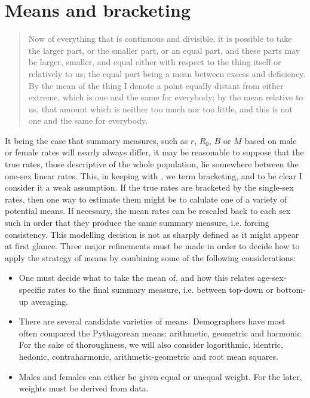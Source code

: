 \documentclass[reqno,12pt,oneside,a4paper]{report} %
\theoremstyle{plain}
\theoremstyle{definition}
\theoremstyle{remark}
\numberwithin{theorem}{chapter}     %
\begin{document}
\section{Means and bracketing}

\begin{singlespace}
\begin{quote}
Now of everything that is continuous and divisible, it is possible to take the larger part, or the smaller part, or an equal part, and these parts may be larger, smaller, and equal either with respect to the thing itself or relatively to us; the equal part being a mean between excess and deficiency. By the mean of the thing I denote a point equally distant from either extreme, which is one and the same for everybody; by the mean relative to us, that amount which is neither too much nor too little, and this is not one and the same for everybody.
\end{quote}
\end{singlespace}


It being the case that summary measures, such as $r$, $R_0$, $B$ or $M$ based on male or female rates will nearly always differ, it may be reasonable to suppose that the true rates, those descriptive of the whole population, lie somewhere between the one-sex linear rates. This, in keeping with \citet{yellin1977comparison}, we term bracketing, and to be clear I consider it a weak assumption. If the true rates are bracketed by the single-sex rates, then one way to estimate them might be to calulate one of a variety of potential means. If necessary, the mean rates can be rescaled back to each sex such in order that they produce the same summary measure, i.e. forcing consistency. This modelling decision is not as sharply defined as it might appear at first glance. Three major refinements must be made in order to decide how to apply the strategy of means by combining some of the following considerations:

\begin{itemize}
\item One must decide what to take the mean of, and how this relates age-sex-specific rates to the final summary measure, i.e. between top-down or bottom-up averaging.
\item There are several candidate varieties of means. Demographers have most often compared the Pythagorean means: arithmetic, geometric and harmonic. For the sake of thoroughness, we will also consider logorithmic, identric, hedonic, contraharmonic, arithmetic-geometric and root mean squares.
\item Males and females can either be given equal or unequal weight. For the later, weights must be derived from data.
\end{itemize}
\end{document}
